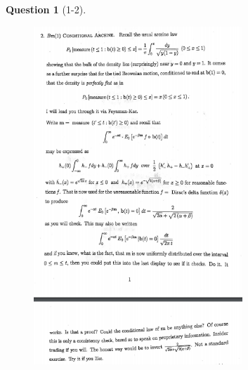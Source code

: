 \documentclass[11pt]{article}
\theoremstyle{plain}
\theoremstyle{quest}
\newtheorem*{question}{Question}
\begin{document}
\newpage

\begin{question}[1-2]
\hfill
\begin{figure}[h!]
  \centering
    \includegraphics[width=0.7\textwidth]{limthm2-f-p2.png}
\end{figure}
\end{question}
\end{document}

